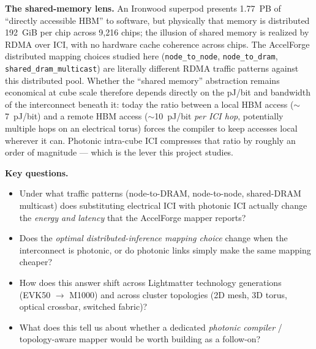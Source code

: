 \documentclass[conference,onecolumn]{IEEEtran}
\begin{document}
\textbf{The shared-memory lens.}
An Ironwood superpod presents 1.77~PB of ``directly accessible HBM'' to
software, but physically that memory is distributed 192~GiB per chip across
9{,}216 chips; the illusion of shared memory is realized by RDMA over ICI,
with no hardware cache coherence across chips. The AccelForge distributed
mapping choices studied here (\texttt{node\_to\_node},
\texttt{node\_to\_dram}, \texttt{shared\_dram\_multicast}) are literally
different RDMA traffic patterns against this distributed pool. Whether the
``shared memory'' abstraction remains economical at cube scale therefore
depends directly on the pJ/bit and bandwidth of the interconnect beneath it:
today the ratio between a local HBM access ($\sim$7~pJ/bit) and a remote HBM
access ($\sim$10~pJ/bit \emph{per ICI hop}, potentially multiple hops on an
electrical torus) forces the compiler to keep accesses local wherever it
can. Photonic intra-cube ICI compresses that ratio by roughly an order of
magnitude --- which is the lever this project studies.

\textbf{Key questions.}
\begin{itemize}
    \item Under what traffic patterns (node-to-DRAM, node-to-node, shared-DRAM
    multicast) does substituting electrical ICI with photonic ICI actually
    change the \emph{energy and latency} that the AccelForge mapper reports?
    \item Does the \emph{optimal distributed-inference mapping choice} change
    when the interconnect is photonic, or do photonic links simply make the
    same mapping cheaper?
    \item How does this answer shift across Lightmatter technology generations
    (EVK50 $\rightarrow$ M1000) and across cluster topologies (2D mesh, 3D
    torus, optical crossbar, switched fabric)?
    \item What does this tell us about whether a dedicated \emph{photonic
    compiler} / topology-aware mapper would be worth building as a follow-on?
\end{itemize}
\end{document}
